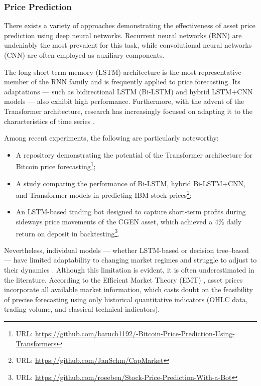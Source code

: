 \subsubsection{Price Prediction}
There exists a variety of approaches demonstrating the effectiveness of asset price prediction using deep
neural networks. Recurrent neural networks (RNN) are undeniably the most prevalent for this task, while
convolutional neural networks (CNN) are often employed as auxiliary components.

The long short-term memory (LSTM) \parencite{Hochreiter1997LSTM} architecture is the most representative
member of the RNN family and is frequently applied to price forecasting. Its adaptations ---
such as bidirectional LSTM (Bi-LSTM) and hybrid LSTM+CNN models --- also exhibit high performance.
Furthermore, with the advent of the Transformer \parencite{vaswani2017attention} architecture,
research has increasingly focused on adapting it to the characteristics of time series
\parencite{wen2022transformers}.

Among recent experiments, the following are particularly noteworthy:
\begin{itemize}
    \item A repository demonstrating the potential of the Transformer architecture for Bitcoin price
    forecasting\footnote{URL: \url{https://github.com/baruch1192/-Bitcoin-Price-Prediction-Using-Transformers}};
    \item A study comparing the performance of Bi-LSTM, hybrid Bi-LSTM+CNN, and Transformer models
    in predicting IBM stock prices\footnote{URL: \url{https://github.com/JanSchm/CapMarket}};
    \item An LSTM-based trading bot designed to capture short-term profits during sideways price
    movements of the CGEN asset, which achieved a 4\% daily return on deposit in backtesting\footnote{URL: \url{https://github.com/roeeben/Stock-Price-Prediction-With-a-Bot}}.
\end{itemize}

Nevertheless, individual models --- whether LSTM-based or decision tree--based --- have limited
adaptability to changing market regimes and struggle to adjust to their dynamics \parencite{Vukovi2024}.
Although this limitation is evident, it is often underestimated in the literature. According
to the Efficient Market Theory (EMT) \parencite{emt1970fama}, asset prices incorporate all available
market information, which casts doubt on the feasibility of precise forecasting using only
historical quantitative indicators (OHLC data, trading volume, and classical technical indicators).

